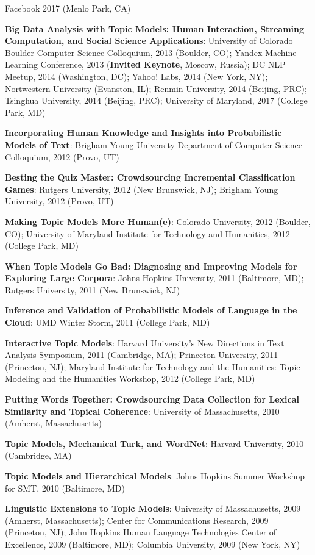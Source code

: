 {{\begin{enumerate*}
Facebook 2017 (Menlo Park, CA)
	\item {\bf Big Data Analysis with Topic Models: Human
            Interaction, Streaming Computation, and Social Science
            Applications}: University of Colorado Boulder Computer
          Science Colloquium, 2013 (Boulder, CO); Yandex Machine
          Learning Conference, 2013 ({\bf Invited Keynote}, Moscow,
          Russia); DC NLP Meetup, 2014 (Washington, DC); Yahoo! Labs, 2014 (New
          York, NY); Nortwestern University (Evanston, IL); Renmin
          University, 2014 (Beijing, PRC); Tsinghua University, 2014
          (Beijing, PRC); University of Maryland, 2017 (College Park,
          MD)
	\item {\bf Incorporating Human Knowledge and Insights into Probabilistic Models of Text}: Brigham Young University Department of Computer Science Colloquium, 2012 (Provo, UT)
	\item {\bf Besting the Quiz Master: Crowdsourcing Incremental Classification Games}: Rutgers University, 2012 (New Brunswick, NJ); Brigham Young University, 2012 (Provo, UT)
	\item {\bf Making Topic Models More Human(e)}: Colorado University, 2012 (Boulder, CO); University of Maryland Institute for Technology and Humanities, 2012 (College Park, MD)
	\item {\bf When Topic Models Go Bad: Diagnosing and Improving Models for Exploring Large Corpora}: Johns Hopkins University, 2011 (Baltimore, MD); Rutgers University, 2011 (New Brunswick, NJ)
	\item {\bf Inference and Validation of Probabilistic Models of Language in the Cloud}: UMD Winter Storm, 2011 (College Park, MD)
	\item {\bf Interactive Topic Models}: Harvard University's New
          Directions in Text Analysis Symposium, 2011 (Cambridge, MA);
          Princeton University, 2011 (Princeton, NJ); Maryland
          Institute for Technology and the Humanities: Topic Modeling
          and the Humanities Workshop, 2012 (College Park, MD)
	\item {\bf Putting Words Together: Crowdsourcing Data Collection for Lexical Similarity and Topical Coherence}: University of Massachusetts, 2010 (Amherst, Massachusetts)
	\item {\bf Topic Models, Mechanical Turk, and WordNet}: Harvard University, 2010 (Cambridge, MA)
	\item {\bf Topic Models and Hierarchical Models}: Johns Hopkins Summer Workshop for SMT, 2010 (Baltimore, MD)
	\item {\bf Linguistic Extensions to Topic Models}: University of
          Massachusetts, 2009 (Amherst, Massachusetts); Center for
          Communications Research, 2009 (Princeton, NJ); John Hopkins Human
          Language Technologies Center of Excellence, 2009 (Baltimore, MD); Columbia University, 2009 (New York, NY)
\end{enumerate*}


}
}



